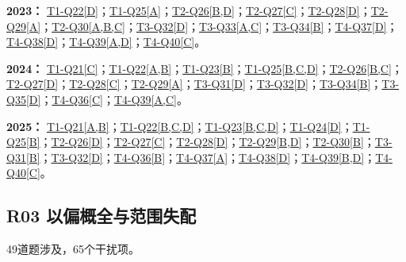 \documentclass[11pt,a4paper]{article}
\begin{document}
\noindent\textbf{2023：} \hyperref[idx-2023-T1-Q22]{T1-Q22[D]}；\hyperref[idx-2023-T1-Q25]{T1-Q25[A]}；\hyperref[idx-2023-T2-Q26]{T2-Q26[B,D]}；\hyperref[idx-2023-T2-Q27]{T2-Q27[C]}；\hyperref[idx-2023-T2-Q28]{T2-Q28[D]}；\hyperref[idx-2023-T2-Q29]{T2-Q29[A]}；\hyperref[idx-2023-T2-Q30]{T2-Q30[A,B,C]}；\hyperref[idx-2023-T3-Q32]{T3-Q32[D]}；\hyperref[idx-2023-T3-Q33]{T3-Q33[A,C]}；\hyperref[idx-2023-T3-Q34]{T3-Q34[B]}；\hyperref[idx-2023-T4-Q37]{T4-Q37[D]}；\hyperref[idx-2023-T4-Q38]{T4-Q38[D]}；\hyperref[idx-2023-T4-Q39]{T4-Q39[A,D]}；\hyperref[idx-2023-T4-Q40]{T4-Q40[C]}。\par\smallskip
\noindent\textbf{2024：} \hyperref[idx-2024-T1-Q21]{T1-Q21[C]}；\hyperref[idx-2024-T1-Q22]{T1-Q22[A,B]}；\hyperref[idx-2024-T1-Q23]{T1-Q23[B]}；\hyperref[idx-2024-T1-Q25]{T1-Q25[B,C,D]}；\hyperref[idx-2024-T2-Q26]{T2-Q26[B,C]}；\hyperref[idx-2024-T2-Q27]{T2-Q27[D]}；\hyperref[idx-2024-T2-Q28]{T2-Q28[C]}；\hyperref[idx-2024-T2-Q29]{T2-Q29[A]}；\hyperref[idx-2024-T3-Q31]{T3-Q31[D]}；\hyperref[idx-2024-T3-Q32]{T3-Q32[D]}；\hyperref[idx-2024-T3-Q34]{T3-Q34[B]}；\hyperref[idx-2024-T3-Q35]{T3-Q35[D]}；\hyperref[idx-2024-T4-Q36]{T4-Q36[C]}；\hyperref[idx-2024-T4-Q39]{T4-Q39[A,C]}。\par\smallskip
\noindent\textbf{2025：} \hyperref[idx-2025-T1-Q21]{T1-Q21[A,B]}；\hyperref[idx-2025-T1-Q22]{T1-Q22[B,C,D]}；\hyperref[idx-2025-T1-Q23]{T1-Q23[B,C,D]}；\hyperref[idx-2025-T1-Q24]{T1-Q24[D]}；\hyperref[idx-2025-T1-Q25]{T1-Q25[B]}；\hyperref[idx-2025-T2-Q26]{T2-Q26[D]}；\hyperref[idx-2025-T2-Q27]{T2-Q27[C]}；\hyperref[idx-2025-T2-Q28]{T2-Q28[D]}；\hyperref[idx-2025-T2-Q29]{T2-Q29[B,D]}；\hyperref[idx-2025-T2-Q30]{T2-Q30[B]}；\hyperref[idx-2025-T3-Q31]{T3-Q31[B]}；\hyperref[idx-2025-T3-Q32]{T3-Q32[D]}；\hyperref[idx-2025-T4-Q36]{T4-Q36[B]}；\hyperref[idx-2025-T4-Q37]{T4-Q37[A]}；\hyperref[idx-2025-T4-Q38]{T4-Q38[D]}；\hyperref[idx-2025-T4-Q39]{T4-Q39[B,D]}；\hyperref[idx-2025-T4-Q40]{T4-Q40[C]}。\par\smallskip
{}
\subsection{R03 以偏概全与范围失配}\label{class-R03}
49道题涉及，65个干扰项。
\end{document}
